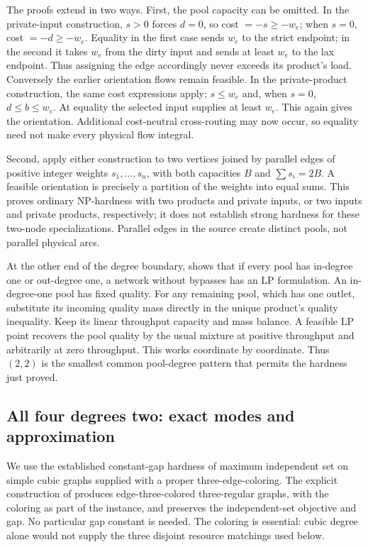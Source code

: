 The proofs extend in two ways. First, the pool capacity can be omitted. In the private-input construction, $s>0$
forces $d=0$, so cost $=-s\ge-w_e$; when $s=0$, cost $=-d\ge-w_e$.
Equality in the first case sends $w_e$ to the strict endpoint; in the
second it takes $w_e$ from the dirty input and sends at least $w_e$ to
the lax endpoint. Thus assigning the edge accordingly never exceeds
its product's load. Conversely the earlier orientation flows remain
feasible. In the private-product construction, the same cost expressions
apply; $s\le w_e$ and, when $s=0$, $d\le b\le w_e$. At equality the
selected input supplies at least $w_e$. This again gives the orientation.
Additional cost-neutral cross-routing may now occur, so equality need
not make every physical flow integral.

Second, apply either construction to two vertices joined by parallel
edges of positive integer weights $s_1,\ldots,s_n$, with both capacities
$B$ and $\sum s_i=2B$. A feasible orientation is precisely a partition
of the weights into equal sums. This proves ordinary NP-hardness with
two products and private inputs, or two inputs and private products,
respectively; it does not establish strong hardness for these two-node
specializations. Parallel edges in the source create distinct pools,
not parallel physical arcs.

At the other end of the degree boundary,
\citet[Proposition~3]{haugland2016-the-computational-complexity-of-the}
shows that if every pool has in-degree one or out-degree one, a network
without bypasses has an LP formulation.
An in-degree-one pool has fixed quality. For any remaining pool, which
has one outlet, substitute its incoming quality mass directly in the
unique product's quality inequality. Keep its linear throughput capacity
and mass balance. A feasible LP point recovers the pool quality by the
usual mixture at positive throughput and arbitrarily at zero throughput.
This works coordinate by coordinate. Thus $(2,2)$ is the smallest common
pool-degree pattern that permits the hardness just proved.

\subsection{All four degrees two: exact modes and approximation}\label{s3:all-two}

We use the established constant-gap hardness of maximum independent set
on simple cubic graphs supplied with a proper three-edge-coloring.
The explicit construction of
\citet[author manuscript, Section~5(A), pp.~25--26]{s3:chlebik2006}
produces edge-three-colored three-regular graphs, with the coloring as
part of the instance, and preserves the independent-set objective and
gap. No particular gap constant is needed. The coloring is essential:
cubic degree alone would not supply the three disjoint resource
matchings used below.

